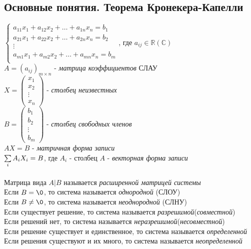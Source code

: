 \documentclass[12pt]{article}
\begin{document}
\subsection{Основные понятия. Теорема Кронекера-Капелли}
$\left\{\begin{array}{cc}
     a_{11} x_1 + a_{12}x_2 + \ldots + a_{1n}x_n = b_1 \\
     a_{21} x_1 + a_{22}x_2 + \ldots + a_{2n}x_n = b_2 \\
     \vdots\\
     a_{m1} x_1 + a_{m2}x_2 + \ldots + a_{mn}x_n = b_m \\
\end{array}\right.$, где $a_{ij} \in \mathbb{R}(\mathbb{C})$\\
$A = (a_{ij})_{m\times n}$ - \textit{матрица коэффициентов} СЛАУ\\
$X = \begin{pmatrix}
x_1\\x_2\\\vdots\\ x_n
\end{pmatrix}$ - \textit{столбец неизвестных}\\
$B = \begin{pmatrix}
b_1\\b_2\\\vdots\\ b_m
\end{pmatrix}$ - \textit{столбец свободных членов}\\
$AX=B$ - \textit{матричная форма записи}\\
$\sum\limits_{i}A_iX_i = B$, где $A_i$ - столбец $A$ - \textit{векторная форма записи}\\\\
Матрица вида $A|B$ называется \textit{расширенной матрицей системы}\\
Если $B = \0$, то система называется \textit{однородной} (СЛОУ)\\
Если $B \neq \0$, то система называется \textit{неоднородной} (СЛНУ)\\
Если существует решение, то система называется \textit{разрешимой}(\textit{совместной})\\
Если решений нет, то система называется \textit{неразрешимой}(\textit{несовместной})\\
Если решение существует и единственное, то система называется \textit{определенной}\\
Если решения существуют и их много, то система называется \textit{неопределенной}\\
\end{document}
